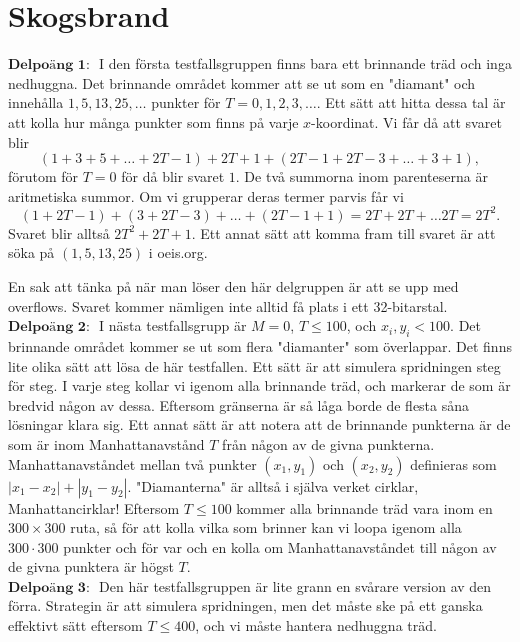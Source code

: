 \section{Skogsbrand}
$\textbf{Delpoäng 1: }$ I den första testfallsgruppen finns bara ett brinnande träd och inga nedhuggna. Det brinnande området kommer att se ut som en "diamant" och innehålla $1,5,13,25,\dots$ punkter för $T = 0,1,2,3,\dots$. Ett sätt att hitta dessa tal är att kolla hur många punkter som finns på varje $x$-koordinat. Vi får då att svaret blir
$$(1 + 3 + 5 + \dots + 2T-1) + 2T + 1 + (2T-1 + 2T-3 + \dots + 3 + 1),$$
förutom för $T = 0$ för då blir svaret $1$. De två summorna inom parenteserna är aritmetiska summor. Om vi grupperar deras termer parvis får vi
$$(1+2T-1) + (3+2T-3) + \dots + (2T-1+1) = 2T + 2T + \dots 2T = 2T^2.$$
Svaret blir alltså $2T^2+2T+1$. Ett annat sätt att komma fram till svaret är att söka på $(1,5,13,25)$ i oeis.org.

En sak att tänka på när man löser den här delgruppen är att se upp med overflows.
Svaret kommer nämligen inte alltid få plats i ett 32-bitarstal. \\

$\textbf{Delpoäng 2: }$ I nästa testfallsgrupp är $M = 0$, $T \leq 100$, och $x_i , y_i < 100$. Det brinnande området kommer se ut som flera "diamanter" som överlappar. Det finns lite olika sätt att lösa de här testfallen. Ett sätt är att simulera spridningen steg för steg. I varje steg kollar vi igenom alla brinnande träd, och markerar de som är bredvid någon av dessa. Eftersom gränserna är så låga borde de flesta såna lösningar klara sig. Ett annat sätt är att notera att de brinnande punkterna är de som är inom Manhattanavstånd $T$ från någon av de givna punkterna. Manhattanavståndet mellan två punkter $(x_1, y_1)$ och $(x_2, y_2)$ definieras som $|x_1-x_2| + |y_1-y_2|$. "Diamanterna" är alltså i själva verket cirklar, Manhattancirklar! Eftersom $T \leq 100$ kommer alla brinnande träd vara inom en $300 \times 300$ ruta, så för att kolla vilka som brinner kan vi loopa igenom alla $300\cdot 300$ punkter och för var och en kolla om Manhattanavståndet till någon av de givna punktera är högst $T$.\\

$\textbf{Delpoäng 3: }$ Den här testfallsgruppen är lite grann en svårare version av den förra. Strategin är att simulera spridningen, men det måste ske på ett ganska effektivt sätt eftersom $T \leq 400$, och vi måste hantera nedhuggna träd. \\

